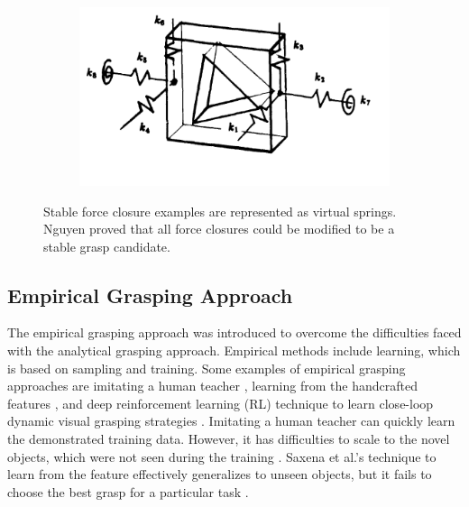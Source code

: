 \begin{figure}
\begin{subfigure}{0.31\textwidth}
      \caption{} \label{fig:1b}
    \end{subfigure}%
    \hspace*{\fill}   %
    \begin{subfigure}{0.31\textwidth}
      \includegraphics[width=\linewidth]{figures/graspC.png}
      \caption{} \label{fig:1c}
    \end{subfigure}

\caption{Stable force closure examples are represented as virtual springs. Nguyen proved that all force closures could be modified to be a stable grasp candidate\cite{Nguyen1987}.} \label{fig:1}
\end{figure}

\subsection{Empirical Grasping Approach}


The empirical grasping approach was introduced to overcome the difficulties faced with the analytical grasping approach. Empirical methods include learning, which is based on sampling and training. Some examples of empirical grasping approaches are imitating a human teacher \cite{Ekvall2004}, learning from the handcrafted features \cite{Saxena2008},  and deep reinforcement learning (RL) technique to learn close-loop dynamic visual grasping strategies \cite{Kalashnikov2018}. Imitating a human teacher can quickly learn the demonstrated training data. However, it has difficulties to scale to the novel objects, which were not seen during the training \cite{Sahbani2012}. Saxena et al.'s technique to learn from the feature effectively generalizes to unseen objects, but it fails to choose the best grasp for a particular task \cite{Sahbani2012}. 

